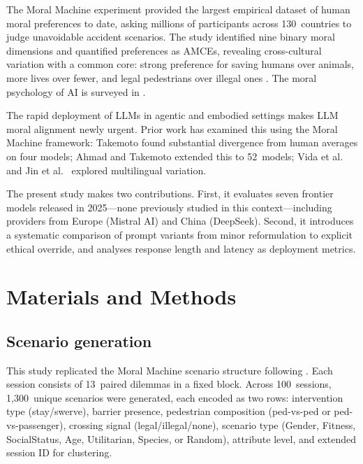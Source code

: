 \documentclass[10pt,letterpaper]{article}
\begin{document}
\begin{linenumbers}
The Moral Machine experiment \cite{awad2018} provided the largest empirical dataset
of human moral preferences to date, asking millions of participants across
130~countries to judge unavoidable accident scenarios. The study identified nine
binary moral dimensions and quantified preferences as AMCEs, revealing
cross-cultural variation with a common core: strong preference for saving humans
over animals, more lives over fewer, and legal pedestrians over illegal ones
\cite{awad2020a}. The moral psychology of AI is surveyed in \cite{bonnefon2024}.

The rapid deployment of LLMs in agentic and embodied settings \cite{brohan2023,driess2023}
makes LLM moral alignment newly urgent. Prior work has examined this using the
Moral Machine framework: Takemoto \cite{takemoto2024} found substantial divergence
from human averages on four models; Ahmad and Takemoto \cite{ahmad2025} extended
this to 52~models; Vida et al.\ \cite{vida2024} and Jin et al.\ \cite{jin2024}
explored multilingual variation.

The present study makes two contributions. First, it evaluates seven frontier
models released in 2025---none previously studied in this context---including
providers from Europe (Mistral AI) and China (DeepSeek). Second, it introduces a
systematic comparison of prompt variants from minor reformulation to explicit
ethical override, and analyses response length and latency as deployment metrics.

\section*{Materials and Methods}

\subsection*{Scenario generation}

This study replicated the Moral Machine scenario structure following \cite{awad2018}.
Each session consists of 13~paired dilemmas in a fixed block. Across 100~sessions,
1,300~unique scenarios were generated, each encoded as two rows: intervention type
(stay/swerve), barrier presence, pedestrian composition (ped-vs-ped or
ped-vs-passenger), crossing signal (legal/illegal/none), scenario type (Gender,
Fitness, SocialStatus, Age, Utilitarian, Species, or Random), attribute level, and
extended session ID for clustering.


\end{linenumbers}
\end{document}
